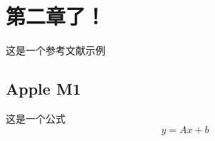 \documentclass[bachelor]{njupthesis}
\begin{document}

\chapter{第二章了！}
这是一个参考文献示例\cite{PRODEN}

\section{Apple M1}
这是一个公式
\begin{equation}
	y=A x+b
\end{equation}
\end{document}
